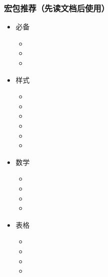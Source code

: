       \begin{frame}[fragile]
        \frametitle{宏包推荐（\textbf{先读文档}后使用）}
        \setlength{\leftmarginii}{1.5em}
        \vspace{-2em}
        \begin{multicols}{3}
          \begin{itemize}
            \item 必备
      
              \begin{itemize}
                \item {}
                \item {}
                \item {}
              \end{itemize}
      
            \item 样式
      
              \begin{itemize}
                \item {}
                \item {}
                \item {}
                \item {}
                \item {}
                \item {}
              \end{itemize}
      
            \item 数学
      
              \begin{itemize}
                \item {}
                \item {}
                \item {}
                \item {}
              \end{itemize}
      
            \item 表格
      
              \begin{itemize}
                \item {}
                \item {}
                \item {}
                \item {}
              \end{itemize}
      

\end{itemize}
\end{multicols}
\end{frame}
